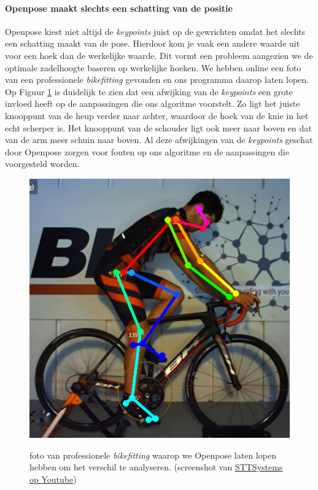 \documentclass[a4paper,twoside,kulak]{kulakreport}
\begin{document}
\paragraph{Openpose maakt slechts een schatting van de positie}
Openpose kiest niet altijd de \textit{keypoints} juist op de gewrichten omdat het slechts een schatting maakt van de pose. Hierdoor kom je vaak een andere waarde uit voor een hoek dan de werkelijke waarde. Dit vormt een probleem aangezien we de optimale zadelhoogte baseren op werkelijke hoeken. We hebben online een foto van een professionele \textit{bikefitting} gevonden en ons programma daarop laten lopen. Op Figuur \ref{proffessionele_bikefit} is duidelijk te zien dat een afwijking van de \textit{keypoints} een grote invloed heeft op de aanpassingen die ons algoritme voorstelt. Zo ligt het juiste knooppunt van de heup verder naar achter, waardoor de hoek van de knie in het echt scherper is. Het knooppunt van de schouder ligt ook meer naar boven en dat van de arm meer schuin naar boven. Al deze afwijkingen van de \textit{keypoints} geschat door Openpose zorgen voor fouten op ons algoritme en de aanpassingen die voorgesteld worden.

\begin{figure}[H]
	\centering
	\includegraphics[width= \textwidth]{prof_bikefit}
	\label{proffessionele_bikefit}
	\caption{foto van professionele \textit{bikefitting} waarop we Openpose laten lopen hebben om het verschil te analyseren. (screenshot van \href{https://www.youtube.com/watch?v=CTYmJi6zH6oabchannel=STTSystems}{STTSystems op Youtube})}
\end{figure}
\end{document}
